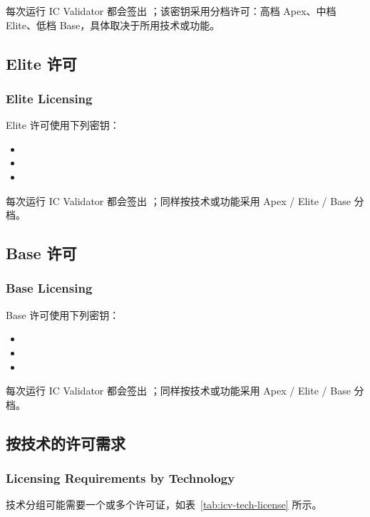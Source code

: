 每次运行 IC Validator 都会签出 ；该密钥采用分档许可：高档 Apex、中档 Elite、低档 Base，具体取决于所用技术或功能。

\subsection{Elite 许可}
\subsubsection*{Elite Licensing}

Elite 许可使用下列密钥：
\begin{itemize}
  \item {}
  \item {}
  \item {}
\end{itemize}

每次运行 IC Validator 都会签出 ；同样按技术或功能采用 Apex / Elite / Base 分档。

\subsection{Base 许可}
\subsubsection*{Base Licensing}

Base 许可使用下列密钥：
\begin{itemize}
  \item {}
  \item {}
  \item {}
\end{itemize}

每次运行 IC Validator 都会签出 ；同样按技术或功能采用 Apex / Elite / Base 分档。

\subsection{按技术的许可需求}
\subsubsection*{Licensing Requirements by Technology}

技术分组可能需要一个或多个许可证，如表~\ref{tab:icv-tech-license} 所示。

